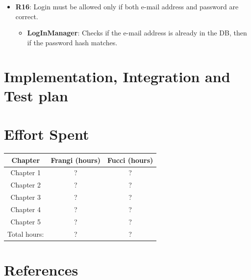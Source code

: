 \documentclass[12pt,a4paper]{report}
\begin{document}
\begin{itemize}
	\item\textbf{R16}: Login must be allowed only if both e-mail address and password are correct.
		\begin{itemize}
		\item\textbf{LogInManager}: Checks if the e-mail address is already in the DB, then if the password hash matches.
		\end{itemize}
	\end{itemize}

	\chapter{Implementation, Integration and Test plan}

	\chapter{Effort Spent}
		\begin{table}[H]
		\centering
		\begin{tabular}{|c|c|c|}
			\hline
			Chapter & Frangi (hours) & Fucci (hours)\\
			\hline
			\hline
			Chapter 1 & ? & ?\\
			\hline
			Chapter 2 & ? & ?\\
			\hline
			Chapter 3 & ? & ?\\
			\hline
			Chapter 4 & ? & ?\\
			\hline
			Chapter 5 & ? & ?\\
			\hline
			Total hours: & ? & ?\\
			\hline
		\end{tabular}
		\label{tab: }
	\end{table}
	\chapter{References}
\end{document}
